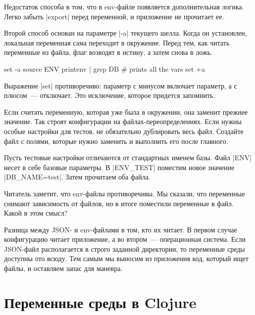 Недостаток способа в том, что в env-файле появляется дополнительная
логика. Легко забыть \spverb|export| перед переменной, и приложение не прочитает
ее.

Второй способ основан на параметре \spverb|-a| текущего шелла. Когда он
установлен, локальная переменная сама переходит в окружение. Перед тем, как
читать переменные из файла, флаг возводят в истину, а затем снова в ложь.

\begin{english}
  \begin{bash}
set -a
source ENV
printenv | grep DB
# prints all the vars
set +a
  \end{bash}
\end{english}

Выражение \spverb|set| противоречиво: параметр с минусом включает параметр, а с
плюсом~--- отключает. Это исключение, которое придется запомнить.

Если считать переменную, которая уже была в окружении, она заменит прежнее
значение. Так строят конфигурации на файлах-переопределениях. Если нужны особые
настройки для тестов, не обязательно дублировать весь файл. Создайте файл с
полями, которые нужно заменить и выполнить его после главного.

Пусть тестовые настройки отличаются от стандартных именем базы. Файл
\spverb|ENV| несет в себе базовые параметры. В \spverb|ENV_TEST| поместим новое
значение \spverb|DB_NAME=test|. Затем прочитаем оба файла.

\begin{english}
\end{english}

Читатель заметит, что env-файлы противоречивы. Мы сказали, что переменные
снимают зависимость от файлов, но в итоге поместили переменные в файл. Какой в
этом смысл?

Разница между JSON- и env-файлами в том, кто их читает. В первом случае
конфигурацию читает приложение, а во втором~--- операционная система. Если
JSON-файл располагается в строго заданной директории, то переменные среды
доступны ото всюду. Тем самым мы выносим из приложения код, который ищет файлы,
и оставляем запас для маневра.

\section{Переменные среды в Clojure}

